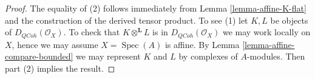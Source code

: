 \documentclass{stacks-project}
\theoremstyle{plain}
\theoremstyle{definition}
\theoremstyle{remark}
\numberwithin{equation}{subsection}
\def\Spec{\mathop{\mathrm{Spec}}}
\def\QCoh{\mathit{QCoh}}
\begin{document}
\begin{proof}
The equality of (2) follows immediately from Lemma \ref{lemma-affine-K-flat}
and the construction of the derived tensor product.
To see (1) let $K, L$ be objects of $D_\QCoh(\mathcal{O}_X)$.
To check that $K \otimes^\mathbf{L} L$ is in
$D_\QCoh(\mathcal{O}_X)$ we may work locally on $X$, hence
we may assume $X = \Spec(A)$ is affine. By
Lemma \ref{lemma-affine-compare-bounded} we may represent
$K$ and $L$ by complexes of $A$-modules. Then part (2) implies
the result.
\end{proof}
\end{document}
